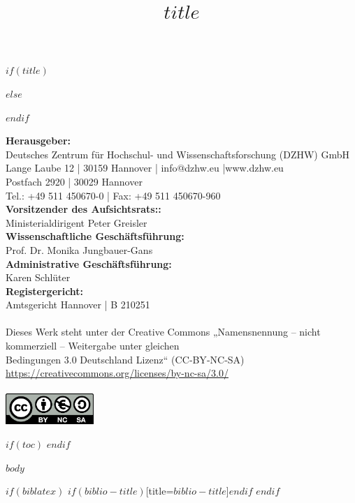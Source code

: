 \documentclass[a4paper,10pt]{article}
\begin{document}
$if(title)$
\title{$title$}
$else$
\title{}
$endif$
\date{} %
\maketitle\thispagestyle{empty}
\newpage
\thispagestyle{empty}
\null\vfill
\footnotesize
\noindent\textbf{Herausgeber:}\\
Deutsches Zentrum für Hochschul- und Wissenschaftsforschung (DZHW) GmbH\\
Lange Laube 12 | 30159 Hannover | info@dzhw.eu |www.dzhw.eu\\
Postfach 2920 | 30029 Hannover\\
Tel.: +49 511 450670-0 | Fax: +49 511 450670-960\\
\textbf{Vorsitzender des Aufsichtsrats::}\\
Ministerialdirigent Peter Greisler\\
\textbf{Wissenschaftliche Geschäftsführung:}\\
Prof. Dr. Monika Jungbauer-Gans\\
\textbf{Administrative Geschäftsführung:}\\
Karen Schlüter\\
\textbf{Registergericht:}\\
Amtsgericht Hannover | B 210251\\
\\
Dieses Werk steht unter der Creative Commons „Namensnennung – nicht\\ kommerziell – Weitergabe unter gleichen\\
Bedingungen 3.0 Deutschland Lizenz“ (CC‐BY‐NC‐SA)\\
\href{http://www.namsu.de}{https://creativecommons.org/licenses/by-nc-sa/3.0/}\\
\\
\includegraphics[width=3.33cm]{by-nc-sa.eu.png}

$if(toc)$
\newpage
\thispagestyle{empty}
\normalsize
{
\hypersetup{linkcolor=black}
\setcounter{tocdepth}{$toc-depth$}
\tableofcontents
}
$endif$

\newpage
\clearpage
\setcounter{page}{1}
$body$

$if(biblatex)$
\newpage
\printbibliography$if(biblio-title)$[title=$biblio-title$]$endif$
$endif$
\end{document}
